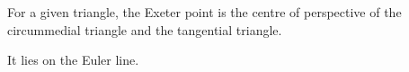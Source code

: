 For a given triangle, the Exeter point is the centre of 
perspective of the circummedial triangle and the tangential triangle.
\par
It lies on the Euler line.